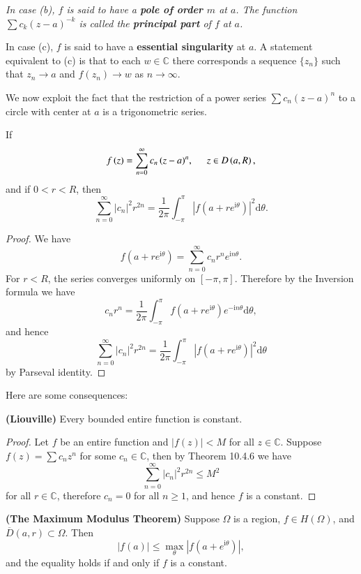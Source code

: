 \begin{note}\em
In case (b), $f$ is said to have a \textbf{pole of order $m$} at $a$. The function $\sum c_k(z-a)^{-k}$ is called the \textbf{principal part} of $f$ at $a$.\par
In case (c), $f$ is said to have a \textbf{essential singularity} at $a$. A statement equivalent to (c) is that to each $w\in\mathbb{C}$ there corresponds a sequence $\{z_n\}$ such that $z_n\to a$ and $f(z_n)\to w$ as $n\to\infty$.
\end{note}
We now exploit the fact that the restriction of a power series $\sum c_n(z-a)^n$ to a circle with center at $a$ is a trigonometric series.
\begin{theorem}
If 
$$
f\left( z \right) =\sum_{n=0}^{\infty}{c_n\left( z-a \right) ^n},\hspace{0.5cm}z\in D\left( a,R \right) ,
$$
and if $0<r<R$, then 
$$
\sum_{n=0}^{\infty}{\left| c_n \right|^2r^{2n}}=\frac{1}{2\pi}\int_{-\pi}^{\pi}{\left| f\left( a+re^{\mathrm{i}\theta} \right) \right|^2\mathrm{d}\theta}.
$$
\end{theorem}
\begin{proof}
We have 
$$
f\left( a+re^{\mathrm{i}\theta} \right) =\sum_{n=0}^{\infty}{c_nr^ne^{\mathrm{i}n\theta}}.
$$
For $r<R$, the series converges uniformly on $[-\pi,\pi]$. Therefore by the Inversion formula we have 
$$
c_nr^n=\frac{1}{2\pi}\int_{-\pi}^{\pi}{f\left( a+re^{\mathrm{i}\theta} \right) e^{-\mathrm{i}n\theta}\mathrm{d}\theta},
$$
and hence 
$$
\sum_{n=0}^{\infty}{\left| c_n \right|^2r^{2n}}=\frac{1}{2\pi}\int_{-\pi}^{\pi}{\left| f\left( a+re^{\mathrm{i}\theta} \right) \right|^2\mathrm{d}\theta}
$$
by Parseval identity.
\end{proof}
Here are some consequences:
\begin{theorem}{\textbf{(Liouville)}}
Every bounded entire function is constant.
\end{theorem}
\begin{proof}
Let $f$ be an entire function and $|f(z)|<M$ for all $z\in\mathbb{C}$. Suppose $f(z)=\sum c_nz^n$ for some $c_n\in\mathbb{C}$, then by Theorem 10.4.6 we have 
$$
\sum_{n=0}^{\infty}{\left| c_n \right|^2r^{2n}}\le M^2
$$
for all $r\in\mathbb{C}$, therefore $c_n=0$ for all $n\ge 1$, and hence $f$ is a constant.
\end{proof}
\begin{theorem}{\textbf{(The Maximum Modulus Theorem)}}
Suppose $\Omega$ is a region, $f\in H(\Omega)$, and $\overline{D}(a,r)\subset\Omega$. Then 
$$
\left| f\left( a \right) \right|\le \max_{\theta} \left| f\left( a+e^{\mathrm{i}\theta} \right) \right|,
$$
and the equality holds if and only if $f$ is a constant.
\end{theorem}

